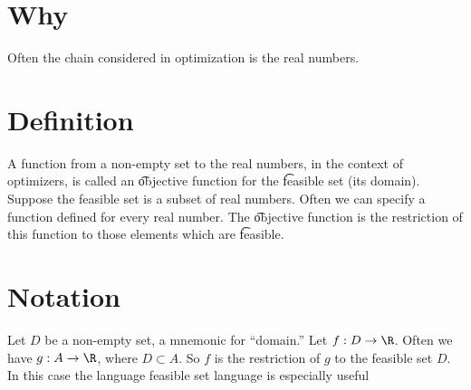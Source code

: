 

\section*{Why}

Often the chain considered in optimization is the real numbers.

\section*{Definition}

A function from a non-empty set to the real numbers, in the context of optimizers, is called an \t{objective function} for the \t{feasible set} (its domain).
Suppose the feasible set is a subset of real numbers.
Often we can specify a function defined for every real number.
The \t{objective function} is the restriction of this function to those elements which are \t{feasible}.

\section*{Notation}

Let $D$ be a non-empty set, a mnemonic for ``domain.''
Let $f: D \to \R $.
Often we have $g: A \to \R $, where $D \subset A$.
So $f$ is the restriction of $g$ to the feasible set $D$.
In this case the language feasible set language is especially useful


\blankpage